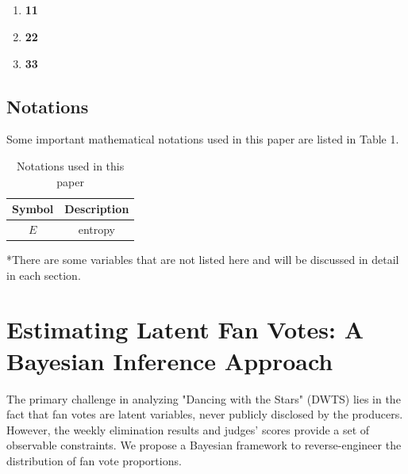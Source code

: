 \documentclass[12pt]{article}
\begin{document}
\subsection{}
\begin{enumerate} %
   \item {\bf 11}
   \item {\bf 22}
   \item {\bf 33}
\end{enumerate}


\subsection{Notations}
Some important mathematical notations used in this paper are listed in Table 1. 
\begin{table}[htbp]
    \begin{center}
        \caption{Notations used in this paper}
        \begin{tabular}{c c}
            \toprule[2pt]
            {\centering Symbol}
            &{\centering Description }\\
            \midrule
            $E$ & entropy \\
            \bottomrule[2pt]
        \end{tabular}
        \begin{tablenotes}
            \footnotesize
            \item[*] *There are some variables that are not listed here and 
            will be discussed in detail in each section. %
        \end{tablenotes}
    \end{center}
\end{table}



\section{Estimating Latent Fan Votes: A Bayesian Inference Approach}

The primary challenge in analyzing "Dancing with the Stars" (DWTS) lies in the fact that fan votes are latent variables, never publicly disclosed by the producers. However, the weekly elimination results and judges' scores provide a set of observable constraints. We propose a Bayesian framework to reverse-engineer the distribution of fan vote proportions.
\end{document}
